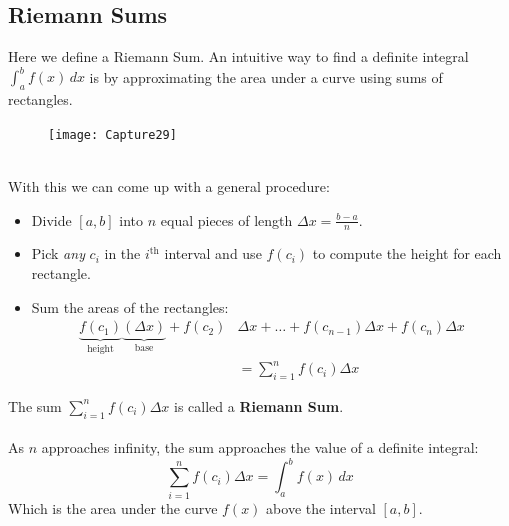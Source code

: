 \documentclass{report}
\begin{document}
\subsection{Riemann Sums} %
Here we define a Riemann Sum. An intuitive way to find a definite integral 
$\int_a^bf(x)\,dx$ is by approximating the area under a curve using sums
of rectangles.
\begin{figure}[h]
\texttt{[image: Capture29]}\\
\centering
{}
\end{figure}\\
With this we can come up with a general procedure:
\begin{itemize}
\item Divide $[a,b]$ into $n$ equal pieces of length 
$\Delta x=\frac{b-a}{n}$.
\item Pick \textit{any} $c_i$ in the $i^{\text{th}}$ interval and use $f(c_i)$
to compute the height for each rectangle.
\item Sum the areas of the rectangles:
\begin{align*}
\underbrace{f(c_1)}_{\text{height}}\underbrace{(\Delta x)}_{\text{base}}
+f(c_2)&\Delta x+\ldots+f(c_{n-1})\Delta x+f(c_n)\Delta x\\
&=\sum_{i=1}^nf(c_i)\Delta x
\end{align*}
\end{itemize}
The sum $\sum_{i=1}^nf(c_i)\Delta x$ is called a \textbf{Riemann Sum}.\\
\vspace{1mm}\\
As $n$ approaches infinity, the sum approaches the value of a definite integral:
\begin{equation*}
\sum_{i=1}^nf(c_i)\Delta x=\int_a^bf(x)\,dx
\end{equation*}
Which is the area under the curve $f(x)$ above the interval $[a,b]$.
\newpage
\end{document}
